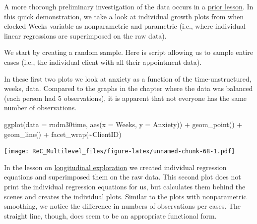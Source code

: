 \documentclass[
  11pt,
]{book}
\newenvironment{Shaded}{\begin{snugshade}}{\end{snugshade}}
\newcommand{\AttributeTok}[1]{\textcolor[rgb]{0.77,0.63,0.00}{#1}}
\newcommand{\DecValTok}[1]{\textcolor[rgb]{0.00,0.00,0.81}{#1}}
\newcommand{\FunctionTok}[1]{\textcolor[rgb]{0.00,0.00,0.00}{#1}}
\newcommand{\NormalTok}[1]{#1}
\newcommand{\OtherTok}[1]{\textcolor[rgb]{0.56,0.35,0.01}{#1}}
\newcommand{\SpecialCharTok}[1]{\textcolor[rgb]{0.00,0.00,0.00}{#1}}
\begin{document}
A more thorough preliminary investigation of the data occurs in a \protect\hyperlink{MLMexplore}{prior lesson}. In this quick demonstration, we take a look at individual growth plots from when clocked Weeks variable as nonparametric and parametric (i.e., where individual linear regressions are superimposed on the raw data).

We start by creating a random sample. Here is script allowing us to sample entire cases (i.e., the individual client with all their appointment data).

\begin{Shaded}
\end{Shaded}

In these first two plots we look at anxiety as a function of the time-unstructured, weeks, data. Compared to the graphs in the chapter where the data was balanced (each person had 5 observations), it is apparent that not everyone has the same number of observations.

\begin{Shaded}
\begin{Highlighting}[]
\FunctionTok{ggplot}\NormalTok{(}\AttributeTok{data =}\NormalTok{ rndm30time, }\FunctionTok{aes}\NormalTok{(}\AttributeTok{x =}\NormalTok{ Weeks, }\AttributeTok{y =}\NormalTok{ Anxiety)) }\SpecialCharTok{+} \FunctionTok{geom\_point}\NormalTok{() }\SpecialCharTok{+} \FunctionTok{geom\_line}\NormalTok{() }\SpecialCharTok{+}
    \FunctionTok{facet\_wrap}\NormalTok{(}\SpecialCharTok{\textasciitilde{}}\NormalTok{ClientID)}
\end{Highlighting}
\end{Shaded}

\texttt{[image: ReC\_Multilevel\_files/figure-latex/unnamed-chunk-68-1.pdf]}

In the lesson on \href{MLMexplore}{longitudinal exploration} we created individual regression equations and superimposed them on the raw data. This second plot does not print the individual regression equations for us, but calculates them behind the scenes and creates the individual plots. Similar to the plots with nonparametric smoothing, we notice the difference in numbers of observations per cases. The straight line, though, does seem to be an appropriate functional form.
\end{document}
